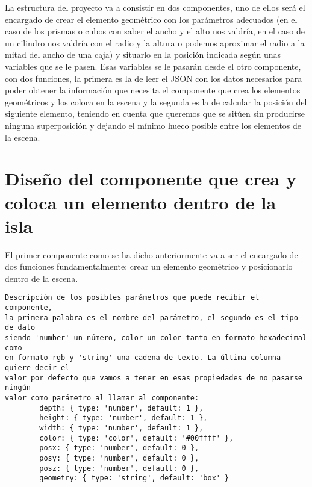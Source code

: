 \documentclass[a4paper, 12pt]{book}
\begin{document}
La estructura del proyecto va a consistir en dos componentes, uno de ellos será el encargado de crear el elemento geométrico con los parámetros adecuados (en el caso de los prismas o cubos con saber el ancho y el alto nos valdría, en el caso de un cilindro nos valdría con el radio y la altura o podemos aproximar el radio a la mitad del ancho de una caja) y situarlo en la posición indicada según unas variables que se le pasen. Esas variables se le pasarán desde el otro componente, con dos funciones, la primera es la de leer el JSON con los datos necesarios para poder obtener la información que necesita el componente que crea los elementos geométricos y los coloca en la escena y la segunda es la de calcular la posición del siguiente elemento, teniendo en cuenta que queremos que se sitúen sin producirse ninguna superposición y dejando el mínimo hueco posible entre los elementos de la escena.
 
\section{Diseño del componente que crea y coloca un elemento dentro de la isla} 
\label{sec:designcomponent1}

El primer componente como se ha dicho anteriormente va a ser el encargado de dos funciones fundamentalmente: crear un elemento geométrico y posicionarlo dentro de la escena. 
{\footnotesize
\begin{verbatim}
Descripción de los posibles parámetros que puede recibir el componente, 
la primera palabra es el nombre del parámetro, el segundo es el tipo de dato 
siendo 'number' un número, color un color tanto en formato hexadecimal como 
en formato rgb y 'string' una cadena de texto. La última columna quiere decir el 
valor por defecto que vamos a tener en esas propiedades de no pasarse ningún 
valor como parámetro al llamar al componente:
        depth: { type: 'number', default: 1 },
        height: { type: 'number', default: 1 },
        width: { type: 'number', default: 1 },
        color: { type: 'color', default: '#00ffff' },
        posx: { type: 'number', default: 0 },
        posy: { type: 'number', default: 0 },
        posz: { type: 'number', default: 0 },
        geometry: { type: 'string', default: 'box' }
    
\end{verbatim}
}



\end{document}
